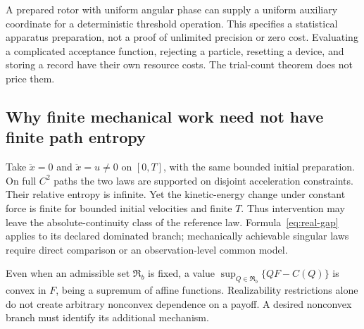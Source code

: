 A prepared rotor with uniform angular phase can supply a uniform auxiliary coordinate for a deterministic threshold operation. This specifies a statistical apparatus preparation, not a proof of unlimited precision or zero cost. Evaluating a complicated acceptance function, rejecting a particle, resetting a device, and storing a record have their own resource costs. The trial-count theorem does not price them.

\subsection{Why finite mechanical work need not have finite path entropy}
Take $\ddot x=0$ and $\ddot x=u\ne0$ on $[0,T]$, with the same bounded initial preparation. On full $C^2$ paths the two laws are supported on disjoint acceleration constraints. Their relative entropy is infinite. Yet the kinetic-energy change under constant force is finite for bounded initial velocities and finite $T$. Thus intervention may leave the absolute-continuity class of the reference law. Formula~\eqref{eq:real-gap} applies to its declared dominated branch; mechanically achievable singular laws require direct comparison or an observation-level common model.

Even when an admissible set $\mathfrak R_b$ is fixed, a value $\sup_{Q\in\mathfrak R_b}\{QF-C(Q)\}$ is convex in $F$, being a supremum of affine functions. Realizability restrictions alone do not create arbitrary nonconvex dependence on a payoff. A desired nonconvex branch must identify its additional mechanism.
\par
